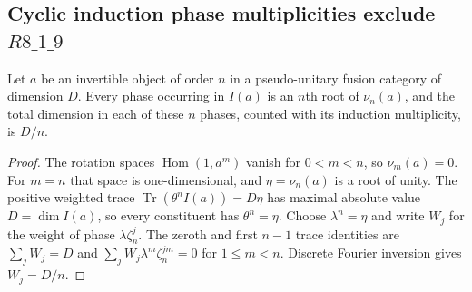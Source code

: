 \subsection{Cyclic induction phase multiplicities exclude $R8\_1\_9$}

\begin{lemma}\label{lem:cyclic-induction-phase-mass}
Let $a$ be an invertible object of order $n$ in a pseudo-unitary
fusion category of dimension $D$. Every phase occurring in $I(a)$
is an $n$th root of $\nu_n(a)$, and the total dimension in each of
these $n$ phases, counted with its induction multiplicity, is $D/n$.
\end{lemma}
\begin{proof}
The rotation spaces $\operatorname{Hom}(1,a^m)$ vanish for
$0<m<n$, so $\nu_m(a)=0$. For $m=n$ that space is
one-dimensional, and $\eta=\nu_n(a)$ is a root of unity.
The positive weighted trace
$\operatorname{Tr}(\theta^n I(a))=D\eta$ has maximal absolute
value $D=\dim I(a)$, so every constituent has $\theta^n=\eta$.
Choose $\lambda^n=\eta$ and write $W_j$ for the weight of phase
$\lambda\zeta_n^j$. The zeroth and first $n-1$ trace identities
are $\sum_jW_j=D$ and
$\sum_jW_j\lambda^m\zeta_n^{jm}=0$ for $1\leq m<n$.
Discrete Fourier inversion gives $W_j=D/n$.
\end{proof}

